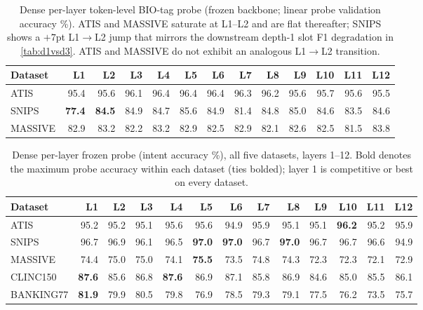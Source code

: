\documentclass{article}
\begin{document}
\begin{table}[t]\centering
\caption{Dense per-layer token-level BIO-tag probe (frozen backbone; linear
probe validation accuracy \%). ATIS and MASSIVE saturate at L1--L2 and are
flat thereafter; SNIPS shows a $+7$pt L1$\to$L2 jump that mirrors the
downstream depth-1 slot F1 degradation in \cref{tab:d1vsd3}. ATIS and
MASSIVE do not exhibit an analogous L1$\to$L2 transition.}
\label{tab:slotprobe}
\small
\begin{tabular}{lrrrrrrrrrrrr}
\toprule
Dataset & L1 & L2 & L3 & L4 & L5 & L6 & L7 & L8 & L9 & L10 & L11 & L12\\
\midrule
ATIS & 95.4 & 95.6 & 96.1 & 96.4 & 96.4 & 96.4 & 96.3 & 96.2 & 95.6 & 95.7 & 95.6 & 95.5\\
SNIPS & \textbf{77.4} & \textbf{84.5} & 84.9 & 84.7 & 85.6 & 84.9 & 81.4 & 84.8 & 85.0 & 84.6 & 83.5 & 84.6\\
MASSIVE & 82.9 & 83.2 & 82.2 & 83.2 & 82.9 & 82.5 & 82.9 & 82.1 & 82.6 & 82.5 & 81.5 & 83.8\\
\bottomrule
\end{tabular}
\end{table}

\begin{table}[t]\centering
\caption{Dense per-layer frozen probe (intent accuracy \%), all five
datasets, layers 1--12. Bold denotes the maximum probe accuracy within each
dataset (ties bolded); layer 1 is competitive or best on every dataset.}
\label{tab:denseprobe}
\small
\begin{tabular}{lrrrrrrrrrrrr}
\toprule
Dataset & L1 & L2 & L3 & L4 & L5 & L6 & L7 & L8 & L9 & L10 & L11 & L12\\
\midrule
ATIS & 95.2 & 95.2 & 95.1 & 95.6 & 95.6 & 94.9 & 95.9 & 95.1 & 95.1 & \textbf{96.2} & 95.2 & 95.9\\
SNIPS & 96.7 & 96.9 & 96.1 & 96.5 & \textbf{97.0} & \textbf{97.0} & 96.7 & \textbf{97.0} & 96.7 & 96.7 & 96.6 & 94.9\\
MASSIVE & 74.4 & 75.0 & 75.0 & 74.1 & \textbf{75.5} & 73.5 & 74.8 & 74.3 & 72.3 & 72.3 & 72.1 & 72.9\\
CLINC150 & \textbf{87.6} & 85.6 & 86.8 & \textbf{87.6} & 86.9 & 87.1 & 85.8 & 86.9 & 84.6 & 85.0 & 85.5 & 86.1\\
BANKING77 & \textbf{81.9} & 79.9 & 80.5 & 79.8 & 76.9 & 78.5 & 79.3 & 79.1 & 77.5 & 76.2 & 73.5 & 75.7\\
\bottomrule
\end{tabular}
\end{table}
\end{document}
